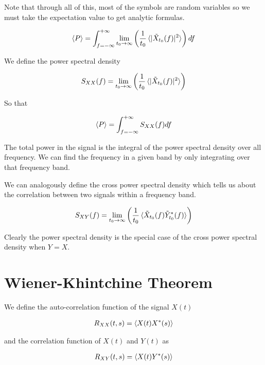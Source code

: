 \documentclass[12pt]{article}
\begin{document}
Note that through all of this, most of the symbols are random variables so we must take the expectation value to get analytic formulas.

\begin{align}
\braket{P} = \int_{f=-\infty}^{+\infty} \lim_{t_0\rightarrow \infty}\left(  \frac{1}{t_0}  \braket{|\tilde{X}_{t_0}(f)|^2 }\right)df
\end{align}

We define the power spectral density

\begin{align}
S_{XX}(f) = \lim_{t_0\rightarrow \infty}\left( \frac{1}{t_0}  \braket{|\tilde{X}_{t_0}(f)|^2 }\right)
\end{align}

So that

\begin{align}
\braket{P} = \int_{f=-\infty}^{+\infty} S_{XX}(f) df
\end{align}

The total power in the signal is the integral of the power spectral density over all frequency. We can find the frequency in a given band by only integrating over that frequency band.

We can analogously define the cross power spectral density which tells us  about the correlation between two signals within a frequency band.

\begin{align}
S_{XY}(f) = \lim_{t_0\rightarrow{\infty}}\left(\frac{1}{t_0}\braket{\tilde{X}_{t_0}(f)\tilde{Y}^*_{t_0}(f)}\right)
\end{align}

Clearly the power spectral density is the special case of the cross power spectral density when $Y=X$.

\section{Wiener-Khintchine Theorem}

We define the auto-correlation function of the signal $X(t)$

\begin{align}
R_{XX}(t,s) = \braket{X(t)X^*(s)}
\end{align}

and the correlation function of $X(t)$ and $Y(t)$ as

\begin{align}
R_{XY}(t,s) = \braket{X(t)Y^*(s)}
\end{align}
\end{document}
